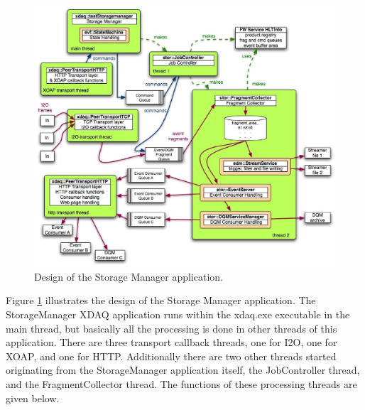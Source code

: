 \begin{figure}[hbtp]
  \begin{center}
    \includegraphics[width=6.0in]{Software/SM_System.eps}
    \caption{Design of the Storage Manager application.}
    \label{fig:SM_System}
  \end{center}
\end{figure}

Figure \ref{fig:SM_System} illustrates the design of the Storage Manager
application. The StorageManager XDAQ application runs within the xdaq.exe
executable in the main thread,
but basically all the processing is done in other threads of this application.
There are three transport callback threads, one for I2O, one for XOAP, and one
for HTTP.  Additionally there are two other threads started originating from the
StorageManager application itself, the JobController thread, and the
FragmentCollector thread. The functions of these processing threads are
given below.

